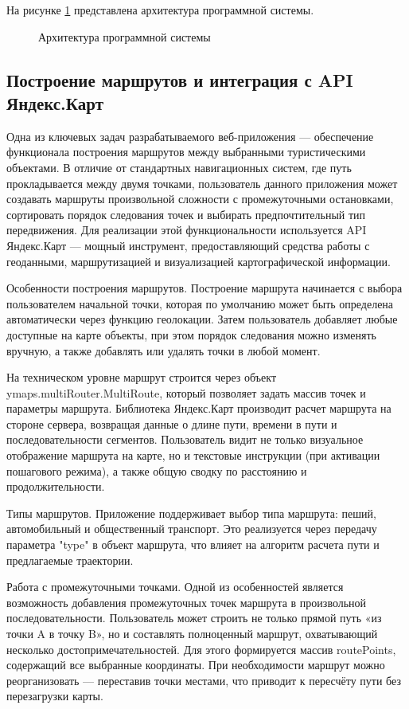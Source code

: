 На рисунке \ref{data:image} представлена архитектура программной системы.

\begin{figure}[ht]
	\caption{Архитектура программной системы}
	\label{data:image}
\end{figure}

\subsection{Построение маршрутов и интеграция с API Яндекс.Карт}

Одна из ключевых задач разрабатываемого веб-приложения — обеспечение функционала построения маршрутов между выбранными туристическими объектами. В отличие от стандартных навигационных систем, где путь прокладывается между двумя точками, пользователь данного приложения может создавать маршруты произвольной сложности с промежуточными остановками, сортировать порядок следования точек и выбирать предпочтительный тип передвижения. Для реализации этой функциональности используется API Яндекс.Карт — мощный инструмент, предоставляющий средства работы с геоданными, маршрутизацией и визуализацией картографической информации.

Особенности построения маршрутов. 
Построение маршрута начинается с выбора пользователем начальной точки, которая по умолчанию может быть определена автоматически через функцию геолокации. Затем пользователь добавляет любые доступные на карте объекты, при этом порядок следования можно изменять вручную, а также добавлять или удалять точки в любой момент.

На техническом уровне маршрут строится через объект ymaps.multiRouter.MultiRoute, который позволяет задать массив точек и параметры маршрута. Библиотека Яндекс.Карт производит расчет маршрута на стороне сервера, возвращая данные о длине пути, времени в пути и последовательности сегментов. Пользователь видит не только визуальное отображение маршрута на карте, но и текстовые инструкции (при активации пошагового режима), а также общую сводку по расстоянию и продолжительности.

Типы маршрутов. 
Приложение поддерживает выбор типа маршрута: пеший, автомобильный и общественный транспорт. Это реализуется через передачу параметра "type" в объект маршрута, что влияет на алгоритм расчета пути и предлагаемые траектории.

Работа с промежуточными точками. 
Одной из особенностей является возможность добавления промежуточных точек маршрута в произвольной последовательности. Пользователь может строить не только прямой путь «из точки A в точку B», но и составлять полноценный маршрут, охватывающий несколько достопримечательностей. Для этого формируется массив routePoints, содержащий все выбранные координаты. При необходимости маршрут можно реорганизовать — переставив точки местами, что приводит к пересчёту пути без перезагрузки карты.

